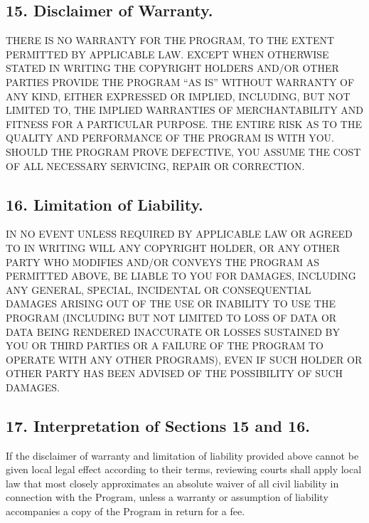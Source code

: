\documentclass[letterpaper,10pt,english]{sphinxmanual}
\begin{document}
\subsection{15. Disclaimer of Warranty.}
\label{\detokenize{license:disclaimer-of-warranty}}
\sphinxAtStartPar
THERE IS NO WARRANTY FOR THE PROGRAM, TO THE EXTENT PERMITTED BY
APPLICABLE LAW.  EXCEPT WHEN OTHERWISE STATED IN WRITING THE COPYRIGHT
HOLDERS AND/OR OTHER PARTIES PROVIDE THE PROGRAM “AS IS” WITHOUT WARRANTY
OF ANY KIND, EITHER EXPRESSED OR IMPLIED, INCLUDING, BUT NOT LIMITED TO,
THE IMPLIED WARRANTIES OF MERCHANTABILITY AND FITNESS FOR A PARTICULAR
PURPOSE.  THE ENTIRE RISK AS TO THE QUALITY AND PERFORMANCE OF THE PROGRAM
IS WITH YOU.  SHOULD THE PROGRAM PROVE DEFECTIVE, YOU ASSUME THE COST OF
ALL NECESSARY SERVICING, REPAIR OR CORRECTION.


\subsection{16. Limitation of Liability.}
\label{\detokenize{license:limitation-of-liability}}
\sphinxAtStartPar
IN NO EVENT UNLESS REQUIRED BY APPLICABLE LAW OR AGREED TO IN WRITING
WILL ANY COPYRIGHT HOLDER, OR ANY OTHER PARTY WHO MODIFIES AND/OR CONVEYS
THE PROGRAM AS PERMITTED ABOVE, BE LIABLE TO YOU FOR DAMAGES, INCLUDING ANY
GENERAL, SPECIAL, INCIDENTAL OR CONSEQUENTIAL DAMAGES ARISING OUT OF THE
USE OR INABILITY TO USE THE PROGRAM (INCLUDING BUT NOT LIMITED TO LOSS OF
DATA OR DATA BEING RENDERED INACCURATE OR LOSSES SUSTAINED BY YOU OR THIRD
PARTIES OR A FAILURE OF THE PROGRAM TO OPERATE WITH ANY OTHER PROGRAMS),
EVEN IF SUCH HOLDER OR OTHER PARTY HAS BEEN ADVISED OF THE POSSIBILITY OF
SUCH DAMAGES.


\subsection{17. Interpretation of Sections 15 and 16.}
\label{\detokenize{license:interpretation-of-sections-15-and-16}}
\sphinxAtStartPar
If the disclaimer of warranty and limitation of liability provided
above cannot be given local legal effect according to their terms,
reviewing courts shall apply local law that most closely approximates
an absolute waiver of all civil liability in connection with the
Program, unless a warranty or assumption of liability accompanies a
copy of the Program in return for a fee.
\begin{quote}

\sphinxAtStartPar
{}
\end{quote}
\end{document}
